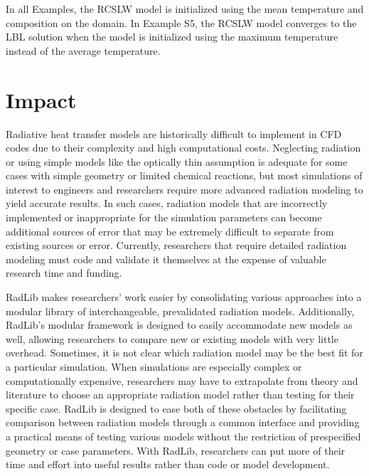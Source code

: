 \documentclass[preprint,12pt, a4paper]{elsarticle}
\begin{document}
In all Examples, the RCSLW model is initialized using the mean temperature and composition on the domain. In Example S5, the RCSLW model converges to the LBL solution when the model is initialized using the maximum temperature instead of the average temperature.



\section{Impact}
\label{s:impact}

Radiative heat transfer models are historically difficult to implement in CFD codes due to their complexity and high computational costs. Neglecting radiation or using simple models like the optically thin assumption is adequate for some cases with simple geometry or limited chemical reactions, but most simulations of interest to engineers and researchers require more advanced radiation modeling to yield accurate results. In such cases, radiation models that are incorrectly implemented or inappropriate for the simulation parameters can become additional sources of error that may be extremely difficult to separate from existing sources or error. Currently, researchers that require detailed radiation modeling must code and validate it themselves at the expense of valuable research time and funding. 

RadLib makes researchers' work easier by consolidating various approaches into a modular library of interchangeable, prevalidated radiation models. Additionally, RadLib's modular framework is designed to easily accommodate new models as well, allowing researchers to compare new or existing models with very little overhead. Sometimes, it is not clear which radiation model may be the best fit for a particular simulation. When simulations are especially complex or computationally expensive, researchers may have to extrapolate from theory and literature to choose an appropriate radiation model rather than testing for their specific case. RadLib is designed to ease both of these obstacles by facilitating comparison between radiation models through a common interface and providing a practical means of testing various models without the restriction of prespecified geometry or case parameters. With RadLib, researchers can put more of their time and effort into useful results rather than code or model development. 
\end{document}
